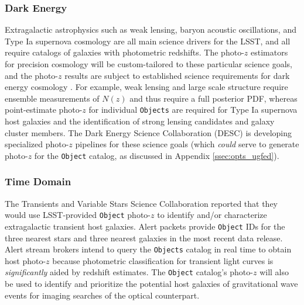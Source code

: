 \documentclass[DM,lsstdraft,toc]{lsstdoc}
\begin{document}
\subsubsection{Dark Energy}\label{sssec:use_sci_de}
Extragalactic astrophysics such as weak lensing, baryon acoustic oscillations, and Type Ia supernova cosmology are all main science drivers for the LSST, and all require catalogs of galaxies with photometric redshifts.
The photo-$z$ estimators for precision cosmology will be custom-tailored to these particular science goals, and the photo-$z$ results are subject to established science requirements for dark energy cosmology \citep{2018arXiv180901669T}.
For example, weak lensing and large scale structure require ensemble measurements of $N(z)$ and thus require a full posterior PDF, whereas point-estimate photo-$z$ for individual {\tt Objects} are required for Type Ia supernova host galaxies and the identification of strong lensing candidates and galaxy cluster members. 
The Dark Energy Science Collaboration (DESC) is developing specialized photo-$z$ pipelines for these science goals (which {\it could} serve to generate photo-$z$ for the {\tt Object} catalog, as discussed in Appendix \ref{ssec:opts_ugfed}).

\subsubsection{Time Domain}\label{sssec:use_sci_td}
The Transients and Variable Stars Science Collaboration reported that they would use LSST-provided {\tt Object} photo-$z$ to identify and/or characterize extragalactic transient host galaxies.
Alert packets provide {\tt Object} IDs for the three nearest stars and three nearest galaxies in the most recent data release.
Alert stream brokers intend to query the {\tt Objects} catalog in real time to obtain host photo-$z$ because photometric classification for transient light curves is {\it significantly} aided by redshift estimates.
The {\tt Object} catalog's photo-$z$ will also be used to identify and prioritize the potential host galaxies of gravitational wave events for imaging searches of the optical counterpart.
\end{document}
